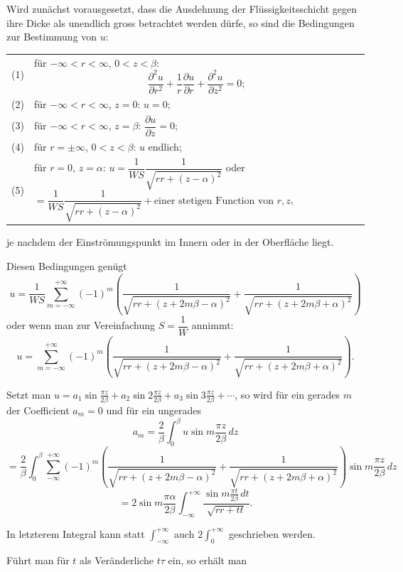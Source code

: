 \documentclass[12pt,a4paper]{article}
\begin{document}
Wird zunächst vorausgesetzt, dass die Ausdehnung der Flüssigkeitsschicht gegen ihre Dicke als unendlich gross betrachtet werden dürfe, so sind die Bedingungen zur Bestimmung von $u$:

\medskip
\begin{tabular}{@{}l@{\quad}p{}@{}}
(1) & für $-\infty < r < \infty$, $0 < z < \beta$:
\[\frac{\partial^2 u}{\partial r^2} + \frac{1}{r}\frac{\partial u}{\partial r} + \frac{\partial^2 u}{\partial z^2} = 0;\] \\[0.5em]
(2) & für $-\infty < r < \infty$, $z = 0$: $u = 0$; \\[0.3em]
(3) & für $-\infty < r < \infty$, $z = \beta$: $\dfrac{\partial u}{\partial z} = 0$; \\[0.5em]
(4) & für $r = \pm\infty$, $0 < z < \beta$: $u$ endlich; \\[0.3em]
(5) & für $r = 0$, $z = \alpha$: $u = \dfrac{1}{WS}\dfrac{1}{\sqrt{rr + (z - \alpha)^2}}$ oder $= \dfrac{1}{WS}\dfrac{1}{\sqrt{rr + (z - \alpha)^2}} + \text{einer stetigen Function von } r, z$,
\end{tabular}
\medskip

\noindent je nachdem der Einströmungspunkt im Innern oder in der Oberfläche liegt.

Diesen Bedingungen genügt
\[
u = \frac{1}{WS} \sum_{m=-\infty}^{+\infty} (-1)^m \left( \frac{1}{\sqrt{rr + (z + 2m\beta - \alpha)^2}} + \frac{1}{\sqrt{rr + (z + 2m\beta + \alpha)^2}} \right)
\]
oder wenn man zur Vereinfachung $S = \dfrac{1}{W}$ annimmt:
\[
u = \sum_{m=-\infty}^{+\infty} (-1)^m \left( \frac{1}{\sqrt{rr + (z + 2m\beta - \alpha)^2}} + \frac{1}{\sqrt{rr + (z + 2m\beta + \alpha)^2}} \right).
\]

Setzt man $u = a_1 \sin \frac{\pi z}{2\beta} + a_2 \sin 2\frac{\pi z}{2\beta} + a_3 \sin 3\frac{\pi z}{2\beta} + \cdots$, so wird für ein gerades $m$ der Coefficient $a_m = 0$ und für ein ungerades
\[
a_m = \frac{2}{\beta} \int_0^\beta u \sin m\frac{\pi z}{2\beta}\, dz
\]
\[
= \frac{2}{\beta} \int_0^\beta \sum_{-\infty}^{+\infty} (-1)^m \left( \frac{1}{\sqrt{rr + (z + 2m\beta - \alpha)^2}} + \frac{1}{\sqrt{rr + (z + 2m\beta + \alpha)^2}} \right) \sin m\frac{\pi z}{2\beta}\, dz
\]
\[
= 2 \sin m\frac{\pi \alpha}{2\beta} \int_{-\infty}^{+\infty} \frac{\sin m\frac{\pi t}{2\beta}\, dt}{\sqrt{rr + tt}}.
\]

In letzterem Integral kann statt $\int_{-\infty}^{+\infty}$ auch $2\int_0^{+\infty}$ geschrieben werden.

Führt man für $t$ als Veränderliche $t\tau$ ein, so erhält man
\end{document}
